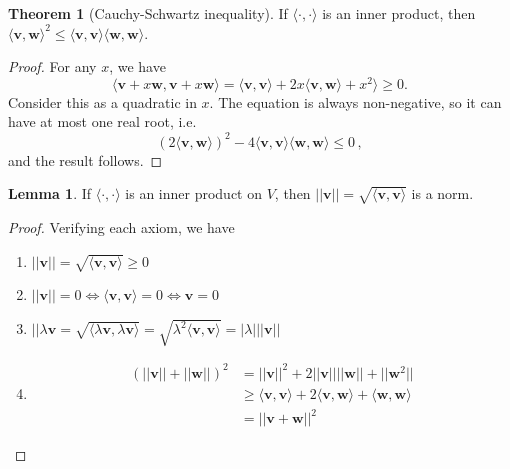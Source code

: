 \documentclass[a4paper,11pt]{article}
\theoremstyle{definition}
\newtheorem*{thm}{Theorem}
\newtheorem*{lem}{Lemma}
\numberwithin{equation}{section}
\begin{document}
\begin{thm}[Cauchy-Schwartz inequality]
If $\langle\cdot,\cdot\rangle$ is an inner product, then $\langle\mathbf{v},\mathbf{w}\rangle^2\leq\langle\mathbf{v},\mathbf{v}\rangle\langle\mathbf{w},\mathbf{w}\rangle$.
\end{thm}
\begin{proof}
For any $x$, we have 
\begin{equation}
    \langle \mathbf{v}+x\mathbf{w},\mathbf{v}+x\mathbf{w}\rangle = \langle\mathbf{v},\mathbf{v}\rangle + 2x\langle\mathbf{v},\mathbf{w}\rangle + x^2 \rangle\geq0.
\end{equation}
Consider this as a quadratic in $x$. The equation is always non-negative, so it can have at most one real root, i.e. 
\begin{equation}
    (2\langle\mathbf{v},\mathbf{w}\rangle)^2 - 4\langle\mathbf{v},\mathbf{v}\rangle \langle\mathbf{w},\mathbf{w}\rangle\leq0\,,
\end{equation}
and the result follows.
\end{proof}

\begin{lem}
If $\langle\cdot,\cdot\rangle$ is an inner product on $V$, then $||\mathbf{v}|| = \sqrt{\langle\mathbf{v},\mathbf{v}\rangle}$ is a norm.
\end{lem}
\begin{proof}
Verifying each axiom, we have
\begin{enumerate}
    \item $||\mathbf{v}||=\sqrt{\langle\mathbf{v},\mathbf{v}\rangle}\geq0$
    \item $||\mathbf{v}||=0\Leftrightarrow\langle\mathbf{v},\mathbf{v}\rangle=0\Leftrightarrow\mathbf{v}=0$
    \item $||\lambda\mathbf{v}=\sqrt{\langle\lambda\mathbf{v},\lambda\mathbf{v}\rangle} = \sqrt{\lambda^2\langle\mathbf{v},\mathbf{v}\rangle}=|\lambda|||\mathbf{v}||$
    \item \begin{align}
        (||\mathbf{v}||+||\mathbf{w}||)^2&=||\mathbf{v}||^2+2||\mathbf{v}||||\mathbf{w}||+||\mathbf{w}^2||\\
        &\geq\langle\mathbf{v},\mathbf{v}\rangle+2\langle\mathbf{v},\mathbf{w}\rangle+\langle\mathbf{w},\mathbf{w}\rangle\\
        &=||\mathbf{v}+\mathbf{w}||^2
    \end{align}
\end{enumerate}
\end{proof}
\end{document}
